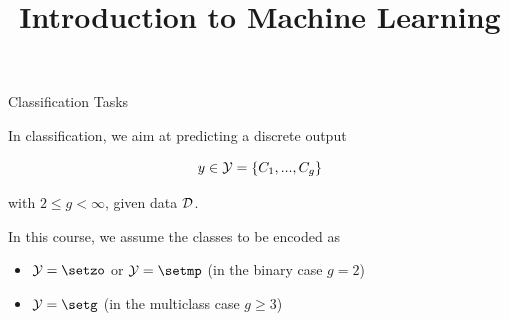 




\newcommand{\titlefigure}{figure/reg_class_bdefs}
\newcommand{\learninggoals}{
\item Understand why classification models have a score / probability as output and not a class
\item Understand the difference between scoring and probabilistic classifiers
\item Know the concept of decision regions and boundaries
\item Know the difference between generative and discriminant approach}


\title{Introduction to Machine Learning}
\date{}



\begin{vbframe}{Classification Tasks}

In classification, we aim at predicting a discrete output 

$$
y \in \mathcal{Y} = \{C_1, ..., C_g\}
$$

with $2 \le g < \infty$, given data $\mathcal{D}$.  

\lz 

In this course, we assume the classes to be encoded as

\begin{itemize}
  \item $\Yspace = \setzo$ or $\Yspace = \setmp$ (in the binary case $g = 2$)
  \item $\Yspace = \setg$  (in the multiclass case $g \ge 3$)
\end{itemize}

\vfill


\end{vbframe}


